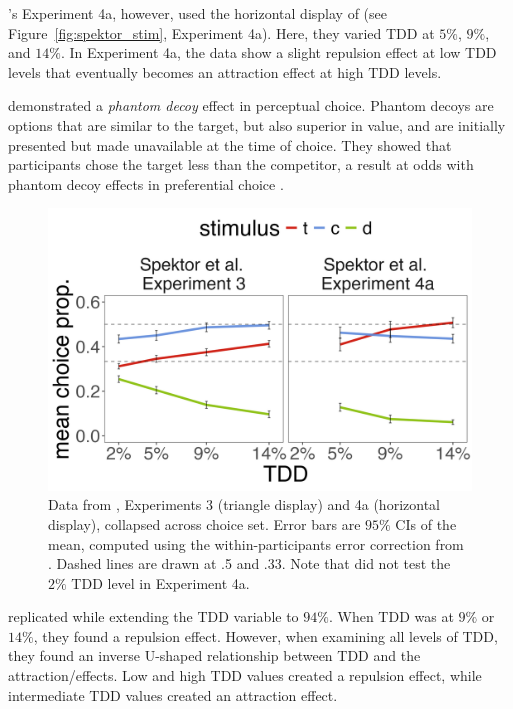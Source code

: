 \textcite{spektorWhenGoodLooks2018b}'s Experiment 4a, however, used the horizontal display of \textcite{trueblood2013not} (see Figure~\ref{fig:spektor_stim}, Experiment 4a). Here, they varied TDD at $5\%$, $9\%$, and $14\%$. In Experiment 4a, the data show a slight repulsion effect at low TDD levels that eventually becomes an attraction effect at high TDD levels. 

\textcite{truebloodPhantomDecoyEffect2017c} demonstrated a \textit{phantom decoy} effect in perceptual choice. Phantom decoys are options that are similar to the target, but also superior in value, and are initially presented but made unavailable at the time of choice. They showed that participants chose the target less than the competitor, a result at odds with phantom decoy effects in preferential choice \parencite{pratkanisBriefHistoryResearch1992b,pettiboneExaminingModelsNondominated2000}. 

\begin{figure}
   \centering
   \includegraphics[width=\linewidth]{figures/spektor_data_collapsed.jpeg}
   \caption{Data from \textcite{spektorWhenGoodLooks2018b}, Experiments 3 (triangle display) and 4a (horizontal display), collapsed across choice set. Error bars are $95\%$ CIs of the mean, computed using the within-participants error correction from \textcite{morey2008confidence}. Dashed lines are drawn at .5 and .33. Note that \textcite{spektorWhenGoodLooks2018b} did not test the $2\%$ TDD level in Experiment 4a.}
   \label{fig:spektor_data} %
\end{figure}

\textcite{liaoInfluenceDistanceDecoy2021} replicated \textcite{spektorWhenGoodLooks2018b} while extending the TDD variable to $94\%$. When TDD was at $9\%$ or $14\%$, they found a repulsion effect. However, when examining all levels of TDD, they found an inverse U-shaped relationship between TDD and the attraction/effects. Low and high TDD values created a repulsion effect, while intermediate TDD values created an attraction effect. 

